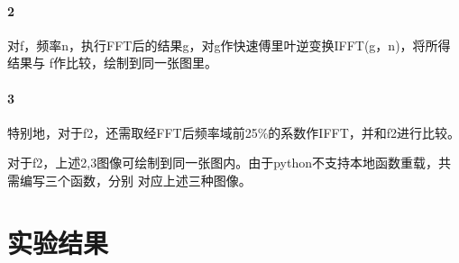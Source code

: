 \documentclass[12pt,a4paper,oneside]{article}
\begin{document}
\paragraph{2} 对f，频率n，执行FFT后的结果g，对g作快速傅里叶逆变换IFFT(g，n)，将所得结果与
f作比较，绘制到同一张图里。
\paragraph{3} 特别地，对于f2，还需取经FFT后频率域前25\%的系数作IFFT，并和f2进行比较。\\ \par
对于f2，上述2,3图像可绘制到同一张图内。由于python不支持本地函数重载，共需编写三个函数，分别
对应上述三种图像。

\section{实验结果}
\end{document}
